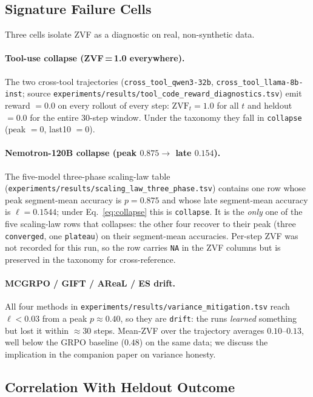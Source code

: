 \subsection{Signature Failure Cells}

Three cells isolate ZVF as a diagnostic on real, non-synthetic data.

\paragraph{Tool-use collapse (ZVF\,=\,1.0 everywhere).}
The two cross-tool trajectories (\texttt{cross\_tool\_qwen3-32b},
\texttt{cross\_tool\_llama-8b-inst}; source
\texttt{experiments/results/tool\_code\_reward\_diagnostics.tsv})
emit reward $= 0.0$ on every rollout of every step: $\mathrm{ZVF}_t
= 1.0$ for all $t$ and heldout $= 0.0$ for the entire
30-step window. Under the taxonomy they fall in
\texttt{collapse} (peak $= 0$, last10 $= 0$).

\paragraph{Nemotron-120B collapse (peak $0.875 \to$ late $0.154$).}
The five-model three-phase scaling-law table
(\texttt{experiments/results/scaling\_law\_three\_phase.tsv})
contains one row whose peak segment-mean accuracy is $p = 0.875$ and
whose late segment-mean accuracy is $\ell = 0.1544$; under
Eq.~\ref{eq:collapse} this is \texttt{collapse}. It is the \emph{only}
one of the five scaling-law rows that collapses: the other four recover
to their peak (three \texttt{converged}, one \texttt{plateau}) on their
segment-mean accuracies. Per-step ZVF was not recorded for this run, so
the row carries \texttt{NA} in the ZVF columns but is preserved in the
taxonomy for cross-reference.

\paragraph{MCGRPO / GIFT / AReaL / ES drift.}
All four methods in \texttt{experiments/results/variance\_mitigation.tsv}
reach $\ell < 0.03$ from a peak $p \approx 0.40$, so they are
\texttt{drift}: the runs \emph{learned} something but lost it within
$\approx 30$ steps. Mean-ZVF over the trajectory averages
$0.10$–$0.13$, well below the GRPO baseline ($0.48$) on the same
data; we discuss the implication in
the companion paper on variance honesty.

\subsection{Correlation With Heldout Outcome}
\label{sec:zvf-cross-experiment:corr}

